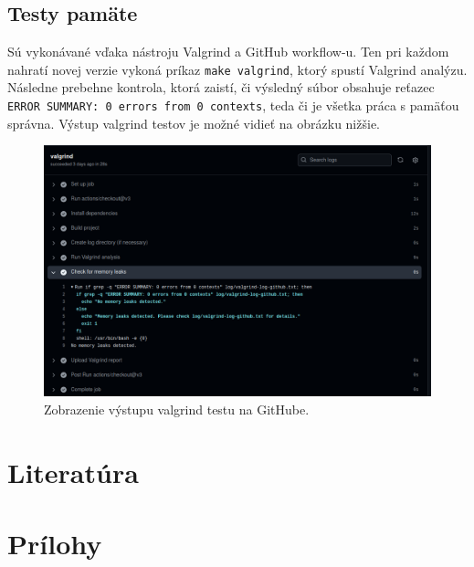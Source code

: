 \documentclass[a4paper, 11pt]{article}
\begin{document}
	\subsection{Testy pamäte}
	Sú vykonávané vďaka nástroju Valgrind a GitHub workflow-u. Ten pri každom nahratí novej verzie vykoná príkaz \texttt{make valgrind}, ktorý spustí Valgrind analýzu. Následne prebehne kontrola, ktorá zaistí, či výsledný súbor obsahuje reťazec \texttt{ERROR SUMMARY: 0 errors from 0 contexts}, teda či je všetka práca s pamäťou správna. Výstup valgrind testov je možné vidieť na obrázku nižšie.
	\label{subsection:testvalgrind}
	\begin{figure}[!ht]
		\centering
		\vspace{1cm}
		\includegraphics[width=0.9\linewidth]{res/test_valgrind.png}
		\caption{Zobrazenie výstupu valgrind testu na GitHube.}
		\label{figure:testvalgrind}
	\end{figure}


    \clearpage
	\section{Literatúra}
	
    \renewcommand{\refname}{}
	

    \clearpage
	\appendix
	\section{Prílohy}
\end{document}
